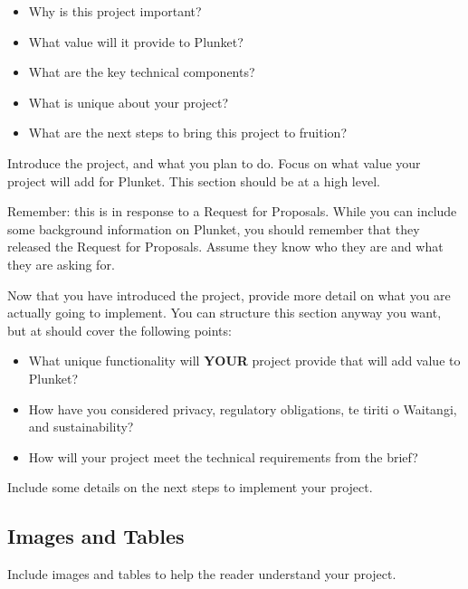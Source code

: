 \documentclass{capstone}
\begin{document}
\begin{itemize}
	\item Why is this project important?
	\item What value will it provide to Plunket?
	\item What are the key technical components?
	\item What is unique about your project?
	\item What are the next steps to bring this project to fruition?
\end{itemize}

\newpage


Introduce the project, and what you plan to do. Focus on what value your project will add for Plunket. This section should be at a high level.

Remember: this is in response to a Request for Proposals. While you can include some background information on Plunket, you should remember that they released the Request for Proposals. Assume they know who they are and what they are asking for.


Now that you have introduced the project, provide more detail on what you are actually going to implement. You can structure this section anyway you want, but at should cover the following points:

\begin{itemize}
    \item What unique functionality will \textbf{YOUR} project provide that will add value to Plunket?
    \item How have you considered privacy, regulatory obligations, te tiriti o Waitangi, and sustainability?
    \item How will your project meet the technical requirements from the brief?
\end{itemize}


Include some details on the next steps to implement your project.

\subsection*{Images and Tables}

Include images and tables to help the reader understand your project. 
\end{document}
